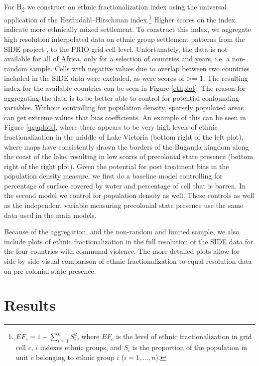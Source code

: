 For H\textsubscript{2} we construct an ethnic fractionalization index using the
universal application of the Herfindahl–Hirschman index.\footnote{\(EF_c = 1 -
	\sum_{i=1}^nS_i^2\), where \(EF_c\) is the level of ethnic
	fractionalization in grid cell $c$, $i$ indexes ethnic groups, and
	\(S_i\) is the proportion of the population in unit $c$ belonging to
ethnic group $i$ (\(i = 1, …, n\)).} Higher scores on the index indicate more
ethnically mixed settlement. To construct this index, we aggregate high
resolution interpolated data on ethnic group settlement patterns from the SIDE
project \citep{M_ller_Crepon_2018}, to the PRIO grid cell level. Unfortunately,
the data is not available for all of Africa, only for a selection of countries
and years, i.e. a non-random sample. Cells with negative values due to overlap
between two countries included in the SIDE data were excluded, as were scores of
>= 1. The resulting index for the available countries can be seen in Figure
\ref{ethplot}. The reason for aggregating the data is to be better able to
control for potential confounding variables. Without controlling for population
density, sparsely populated areas can get extreme values that bias coefficients.
An example of this can be seen in Figure \ref{ugaplots}, where there appears to
be very high levels of ethnic fractionalization in the middle of Lake Victoria
(bottom right of the left plot), where maps have consistently drawn the borders
of the Buganda kingdom along the coast of the lake, resulting in low scores of
precolonial state presence (bottom right of the right plot). Given the potential
for post treatment bias in the population density measure, we first do a
baseline model controlling for percentage of surface covered by water and
percentage of cell that is barren. In the second model we control for population
density as well. These controls as well as the independent variable measuring
precolonial state presence use the same data used in the main models.

Because of the aggregation, and the non-random and limited sample, we also
include plots of ethnic fractionalization in the full resolution of the SIDE
data for the four countries with communal violence. The more detailed plots
allow for side-by-side visual comparison of ethnic fractionalization to equal
resolution data on pre-colonial state presence.

\section{Results} \label{Results}

